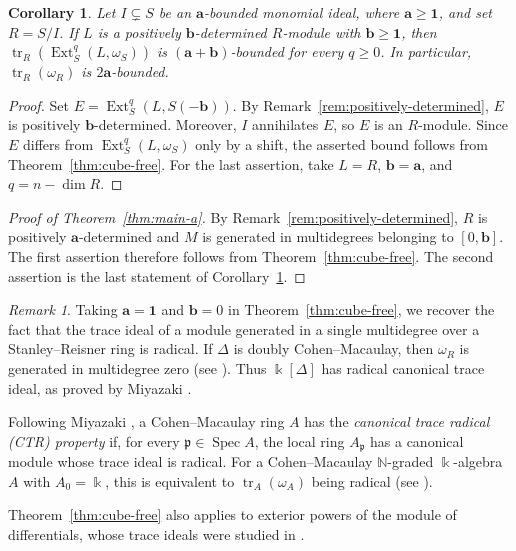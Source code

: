 \documentclass[a4paper,11pt]{amsart}
\theoremstyle{plain}
\newtheorem{corollary}[theorem]{Corollary}
\theoremstyle{definition}
\theoremstyle{remark}
\newtheorem{remark}[theorem]{Remark}
\DeclareMathOperator{\tr}{tr}
\DeclareMathOperator{\Ext}{Ext}
\newcommand{\kk}{\Bbbk}
\newcommand{\NN}{\mathbb N}
\newcommand{\one}{\mathbf1}
\begin{document}
\begin{corollary}\label{cor:monomial-canonical-bound}
Let $I\subsetneq S$ be an $\mathbf{a}$-bounded monomial ideal, where $\mathbf{a}\geq\one$, and set $R=S/I$. If $L$ is a positively $\mathbf{b}$-determined $R$-module with $\mathbf{b}\geq\one$, then $\tr_R(\Ext_S^q(L,\omega_S))$ is $(\mathbf{a}+\mathbf{b})$-bounded for every $q\geq0$. In particular, $\tr_R(\omega_R)$ is $2\mathbf{a}$-bounded.
\end{corollary}
\begin{proof}
Set $E=\Ext_S^q(L,S(-\mathbf{b}))$. By Remark~\ref{rem:positively-determined}, $E$ is positively $\mathbf{b}$-determined. Moreover, $I$ annihilates $E$, so $E$ is an $R$-module. Since $E$ differs from $\Ext_S^q(L,\omega_S)$ only by a shift, the asserted bound follows from Theorem~\ref{thm:cube-free}. For the last assertion, take $L=R$, $\mathbf{b}=\mathbf{a}$, and $q=n-\dim R$.
\end{proof}

\begin{proof}[Proof of Theorem~\ref{thm:main-a}]
By Remark~\ref{rem:positively-determined}, $R$ is positively $\mathbf{a}$-determined and $M$ is generated in multidegrees belonging to $[0,\mathbf{b}]$. The first assertion therefore follows from Theorem~\ref{thm:cube-free}. The second assertion is the last statement of Corollary~\ref{cor:monomial-canonical-bound}.
\end{proof}

\begin{remark}
Taking $\mathbf{a}=\one$ and $\mathbf{b}=0$ in Theorem~\ref{thm:cube-free}, we recover the fact that the trace ideal of a module generated in a single multidegree over a Stanley--Reisner ring is radical. If $\Delta$ is doubly Cohen--Macaulay, then $\omega_R$ is generated in multidegree zero (see \cite[Corollary~2.6]{Yan11}). Thus $\kk[\Delta]$ has radical canonical trace ideal, as proved by Miyazaki \cite[Theorem~3.4]{MiyazakiSem26}.

Following Miyazaki \cite[Definition~3.2]{Miyazaki}, a Cohen--Macaulay ring $A$ has the \emph{canonical trace radical (CTR) property} if, for every $\mathfrak p\in\operatorname{Spec}A$, the local ring $A_{\mathfrak p}$ has a canonical module whose trace ideal is radical. For a Cohen--Macaulay $\NN$-graded $\kk$-algebra $A$ with $A_0=\kk$, this is equivalent to $\tr_A(\omega_A)$ being radical (see \cite[Proposition~3.4]{Miyazaki}).
\end{remark}

Theorem~\ref{thm:cube-free} also applies to exterior powers of the module of differentials, whose trace ideals were studied in \cite{IM26}.
\end{document}
